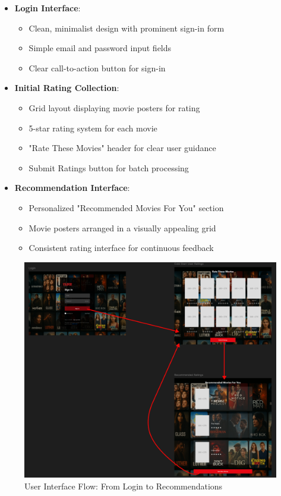 \documentclass[12pt]{article}
\begin{document}
\begin{itemize}
    \item \textbf{Login Interface}:
    \begin{itemize}
        \item Clean, minimalist design with prominent sign-in form
        \item Simple email and password input fields
        \item Clear call-to-action button for sign-in
    \end{itemize}
    
    \item \textbf{Initial Rating Collection}:
    \begin{itemize}
        \item Grid layout displaying movie posters for rating
        \item 5-star rating system for each movie
        \item "Rate These Movies" header for clear user guidance
        \item Submit Ratings button for batch processing
    \end{itemize}
    
    \item \textbf{Recommendation Interface}:
    \begin{itemize}
        \item Personalized "Recommended Movies For You" section
        \item Movie posters arranged in a visually appealing grid
        \item Consistent rating interface for continuous feedback
    \end{itemize}
\end{itemize}

\begin{figure}[h]
    \centering
    \includegraphics[width=\textwidth]{wireframe.png}
    \caption{User Interface Flow: From Login to Recommendations}
    \label{fig:wireframe}
\end{figure}
\end{document}
